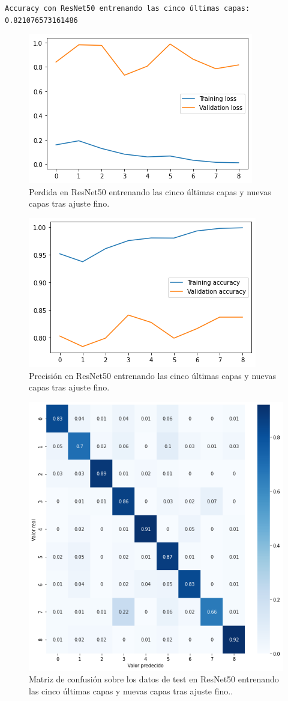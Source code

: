 \begin{lstlisting}
Accuracy con ResNet50 entrenando las cinco últimas capas: 0.821076573161486
\end{lstlisting}




\begin{figure}[H]
  \centering
  \includegraphics[width=0.5\linewidth]{Imagenes/entrenamiento_redes/5-ult/resnet_5fine_loss.png}
  \caption{Perdida en ResNet50 entrenando las cinco últimas capas y nuevas capas tras ajuste fino.}
\end{figure}

\begin{figure}[H]
  \centering
  \includegraphics[width=0.5\linewidth]{Imagenes/entrenamiento_redes/5-ult/resnet_5fine_acc.png}
  \caption{Precisión en ResNet50 entrenando las cinco últimas capas y nuevas capas tras ajuste fino.}
\end{figure}

\begin{figure}[H]
  \centering
  \includegraphics[width=0.5\linewidth]{Imagenes/entrenamiento_redes/5-ult/resnet_5fine_matriz.png}
  \caption{Matriz de confusión sobre los datos de test en ResNet50 entrenando las cinco últimas capas y nuevas capas tras ajuste fino..}
\end{figure}


